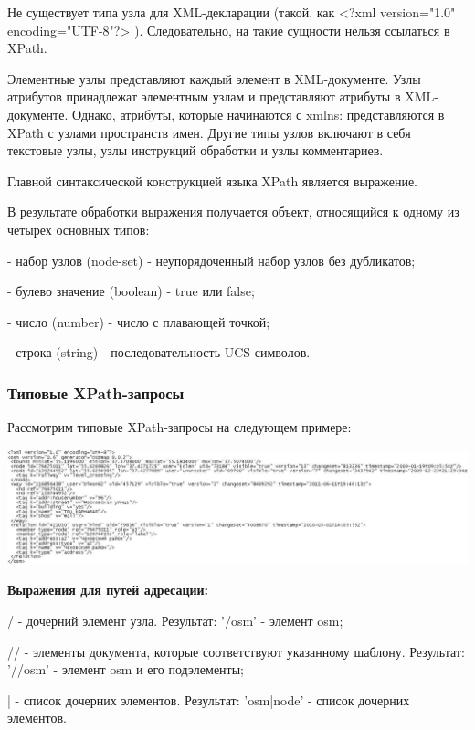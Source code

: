 \documentclass[12pt,a4paper,oneside]{article} %
\begin{document}
Не существует типа узла для XML-декларации (такой, \break как <?xml version="1.0" encoding="UTF-8"?> ). Следовательно, на такие сущности нельзя ссылаться в XPath.

Элементные узлы представляют каждый элемент в XML-документе. Узлы атрибутов принадлежат элементным узлам и представляют атрибуты в XML-документе. Однако, атрибуты, которые начинаются с xmlns: представляются в XPath с узлами пространств имен. Другие типы узлов включают в себя текстовые узлы, узлы инструкций обработки и узлы комментариев.

Главной синтаксической конструкцией языка XPath является выражение.

В результате обработки выражения получается объект, относящийся к одному из четырех основных типов:

- набор узлов (node-set) - неупорядоченный набор узлов без дубликатов;

- булево значение (boolean) - true или false;

- число (number) - число с плавающей точкой;

- строка (string) - последовательность UCS символов.

\subsubsection{Типовые XPath-запросы}

Рассмотрим типовые XPath-запросы на следующем примере:

\includegraphics[width=1\linewidth]{examplemap}

\textbf{Выражения для путей адресации:}

/ - дочерний элемент узла. Результат: '/osm' - элемент osm;

// -  элементы документа, которые соответствуют указанному шаблону. Результат: '//osm' - элемент osm и его подэлементы;

| - список дочерних элементов. Результат: 'osm|node' - список дочерних элементов.
\end{document}
